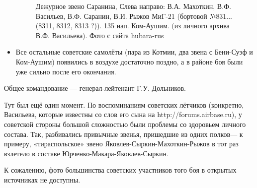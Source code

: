 \begin{itemize}
\begin{figure}[h!tb]
		\caption{Дежурное звено Саранина, Слева направо: В.А. Махоткин, В.Ф. Васильев, В.Ф. Саранин, В.И. Рыжов МиГ-21 (бортовой №831... (8311, 8312, 8313 ?)). 135 иап. Ком-Аушим. (из личного архива В.Ф. Васильева). Фото с сайта hubara-rus}%
	\end{figure}
	\item Все остальные советские самолёты (пара из Котмии, два звена с Бени-Суэф и Ком-Аушим) появились в воздухе достаточно поздно, а в районе боя были уже сильно после его окончания.
\end{itemize}

Общее командование — генерал-лейтенант Г.У. Дольников.

Тут был ещё один момент. По воспоминаниям советских лётчиков (конкретно, Васильева, которые известны со слов его сына на http://forums.airbase.ru), у советской стороны большой сложностью были проблемы со здоровьем личного состава. Так, разбивались привычные звенья, пришедшие из одних полков— к примеру, «тираспольское» звено Яковлев-Сыркин-Махоткин-Рыжов в тот раз взлетело в составе Юрченко-Макара-Яковлев-Сыркин.

К сожалению, фото большинства советских участников того боя в открытых источниках не доступны.

